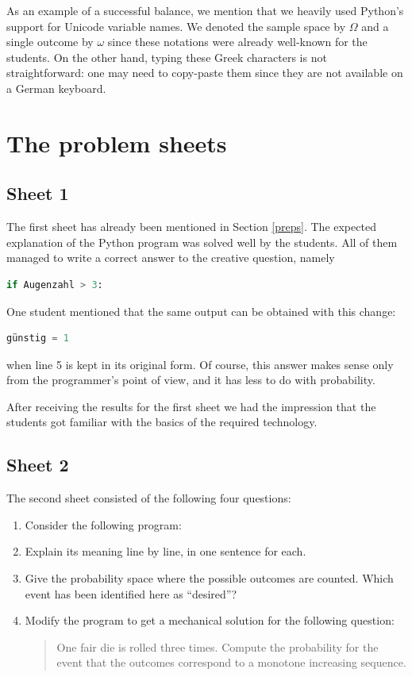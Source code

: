 \documentclass[]{interact}
\theoremstyle{plain}%
\theoremstyle{definition}
\theoremstyle{remark}
\begin{document}
As an example of a successful balance, we mention that we heavily used Python's support
for Unicode variable names.
We denoted the sample space by $\Omega$ and a single outcome by $\omega$ since
these notations were already well-known for the students. On the other hand,
typing these Greek characters is not straightforward: one may need to copy-paste
them since they are not available on a German keyboard.

\section{The problem sheets}
\label{problem-sheets}

\subsection*{Sheet 1}
The first sheet has already been mentioned in Section \ref{preps}.
The expected explanation of the Python program was solved well by the students.
All of them managed to write a correct answer to the creative question, namely
\begin{lstlisting}[language=Python,firstnumber=5]
  if Augenzahl > 3:
\end{lstlisting}
One student mentioned that the same output can be obtained with this change:
\begin{lstlisting}[language=Python,firstnumber=2]
günstig = 1
\end{lstlisting}
when line 5 is kept in its original form. Of course, this answer makes sense
only from the programmer's point of view, and it has less to do with probability.

After receiving the results for the first sheet we had the impression that
the students got familiar with the basics of the required technology.

\subsection*{Sheet 2}

The second sheet consisted of the following four questions:

\begin{enumerate}
\item Consider the following program:


\item Explain its meaning line by line, in one sentence for each.

\item Give the probability space where the possible outcomes are counted.
Which event has been identified here as ``desired''?

\item Modify the program to get a mechanical solution for the following question:

\begin{quote}
One fair die is rolled three times. Compute the probability for the event that the outcomes
correspond to a monotone increasing sequence.
\end{quote}

\end{enumerate}
\end{document}
